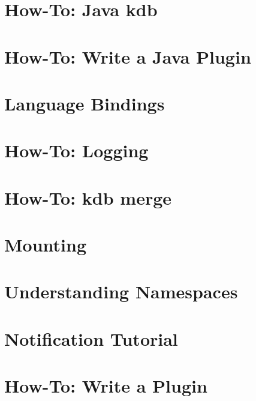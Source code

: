 \let\mypdfximage\pdfximage\def\pdfximage{\immediate\mypdfximage}\documentclass[twoside]{book}
\newcommand{\+}{\discretionary{\mbox{\scriptsize$\hookleftarrow$}}{}{}}
\begin{document}
\chapter{How-\/\+To\+: Java kdb}
\label{doc_tutorials_java-kdb_md}

\chapter{How-\/\+To\+: Write a Java Plugin}
\label{doc_tutorials_java-plugins_md}

\chapter{Language Bindings}
\label{doc_tutorials_language-bindings_md}

\chapter{How-\/\+To\+: Logging}
\label{doc_tutorials_logger_md}

\chapter{How-\/\+To\+: kdb merge}
\label{doc_tutorials_merge_md}

\chapter{Mounting}
\label{doc_tutorials_mount_md}

\chapter{Understanding Namespaces}
\label{doc_tutorials_namespaces_md}

\chapter{Notification Tutorial}
\label{doc_tutorials_notifications_md}

\chapter{How-\/\+To\+: Write a Plugin}
\label{doc_tutorials_plugins_md}

\end{document}
